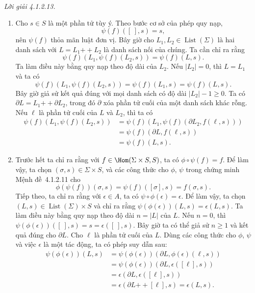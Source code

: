 \noindent\textit{Lời giải 4.1.2.13.}\keepwithnext
\begin{enumerate}[label=\alph*.]
\item Cho $s\in S$ là một phần tử tùy ý. Theo bước cơ sở của phép quy nạp,
\[
\psi(f)([\ ],s)=s,
\]
nên $\psi(f)$ thỏa mãn luật đơn vị. Bây giờ cho $L_1,L_2\in\operatorname{List}(\Sigma)$ là hai danh sách với $L=L_1\mathbin{+\!+}L_2$ là danh sách nối của chúng. Ta cần chỉ ra rằng
\[
\psi(f)(L_1,\psi(f)(L_2,s))=\psi(f)(L,s).
\]
Ta làm điều này bằng quy nạp theo độ dài của $L_2$. Nếu $|L_2|=0$, thì $L=L_1$ và ta có
\[
\psi(f)(L_1,\psi(f)(L_2,s))=\psi(f)(L_1,s)=\psi(f)(L,s).
\]
Bây giờ giả sử kết quả đúng với mọi danh sách có độ dài $|L_2|-1\ge0$. Ta có $\partial L=L_1\mathbin{+\!+}\partial L_2$, trong đó $\partial$ xóa phần tử cuối của một danh sách khác rỗng. Nếu $\ell$ là phần tử cuối của $L$ và $L_2$, thì ta có
\begin{align*}
\psi(f)(L_1,\psi(f)(L_2,s))
&=\psi(f)(L_1,\psi(f)(\partial L_2,f(\ell,s)))\\
&=\psi(f)(\partial L,f(\ell,s))\\
&=\psi(f)(L,s).
\end{align*}
\item Trước hết ta chỉ ra rằng với $f\in\Hom(\Sigma\times S,S)$, ta có $\phi\circ\psi(f)=f$. Để làm vậy, ta chọn $(\sigma,s)\in\Sigma\times S$, và các công thức cho $\phi$, $\psi$ trong chứng minh Mệnh đề~4.1.2.11 cho
\[
\phi(\psi(f))(\sigma,s)=\psi(f)([\sigma],s)=f(\sigma,s).
\]
Tiếp theo, ta chỉ ra rằng với $\epsilon\in A$, ta có $\psi\circ\phi(\epsilon)=\epsilon$. Để làm vậy, ta chọn $(L,s)\in\operatorname{List}(\Sigma)\times S$ và chỉ ra rằng $\psi(\phi(\epsilon))(L,s)=\epsilon(L,s)$. Ta làm điều này bằng quy nạp theo độ dài $n=|L|$ của $L$. Nếu $n=0$, thì $\psi(\phi(\epsilon))([\ ],s)=s=\epsilon([\ ],s)$. Bây giờ ta có thể giả sử $n\ge1$ và kết quả đúng cho $\partial L$. Cho $\ell$ là phần tử cuối của $L$. Dùng các công thức cho $\phi$, $\psi$ và việc $\epsilon$ là một tác động, ta có phép suy dẫn sau:
\begin{align*}
\psi(\phi(\epsilon))(L,s)
&=\psi(\phi(\epsilon))(\partial L,\phi(\epsilon)(\ell,s))\\
&=\psi(\phi(\epsilon))(\partial L,\epsilon([\ell],s))\\
&=\epsilon(\partial L,\epsilon([\ell],s))\\
&=\epsilon(\partial L\mathbin{+\!+}[\ell],s)=\epsilon(L,s).
\tag*{$\blacklozenge$}
\end{align*}
\end{enumerate}


